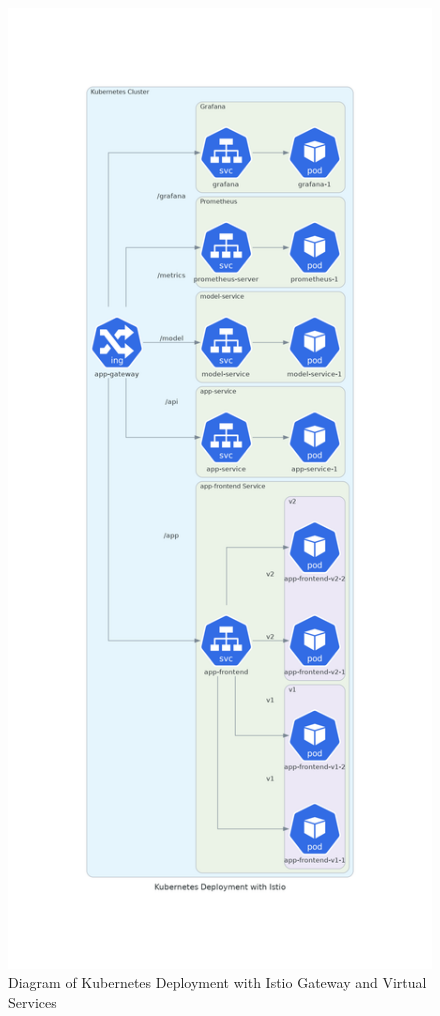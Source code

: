 \begin{figure}[h]
    \centering
    \includegraphics[width=\linewidth]{kubernetes_deployment_with_istio.png}
    \caption{Diagram of Kubernetes Deployment with Istio Gateway and Virtual Services}
    \label{fig:k8s_istio}
\end{figure}


